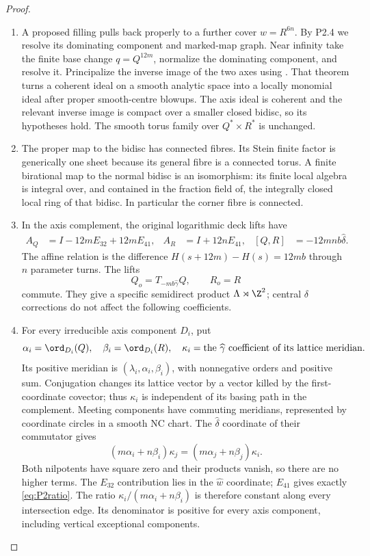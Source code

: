 \begin{proof}
\begin{enumerate}[label=\arabic*.,leftmargin=*]
\item A proposed filling pulls back properly to a further cover $w=R^{6n}$. By P2.4 we resolve its dominating component and marked-map graph. Near infinity take the finite base change $q=Q^{12m}$, normalize the dominating component, and resolve it. Principalize the inverse image of the two axes using \cite[Theorem 1.10, preprint p.~7, with the analytic category in (0.2), p.~3]{BM97}. That theorem turns a coherent ideal on a smooth analytic space into a locally monomial ideal after proper smooth-centre blowups. The axis ideal is coherent and the relevant inverse image is compact over a smaller closed bidisc, so its hypotheses hold. The smooth torus family over $Q^*\times R^*$ is unchanged.

\item The proper map to the bidisc has connected fibres. Its Stein finite factor is generically one sheet because its general fibre is a connected torus. A finite birational map to the normal bidisc is an isomorphism: its finite local algebra is integral over, and contained in the fraction field of, the integrally closed local ring of that bidisc. In particular the corner fibre is connected.

\item In the axis complement, the original logarithmic deck lifts have
\begin{align*}
 A_Q&=I-12mE_{32}+12mE_{41},&
 A_R&=I+12nE_{41},&
 [Q,R]&=-12mnb\widehat\delta.
\end{align*}
The affine relation is the difference $H(s+12m)-H(s)=12mb$ through $n$ parameter turns. The lifts
\[
 Q_o=T_{-mb\widehat\gamma}Q,\qquad R_o=R
\]
commute. They give a specific semidirect product $\Lambda\rtimes\Z^2$; central $\delta$ corrections do not affect the following coefficients.

\item For every irreducible axis component $D_i$, put
\[
 \alpha_i=\ord_{D_i}(Q),\quad\beta_i=\ord_{D_i}(R),\quad
 \kappa_i=\text{the }\widehat\gamma\text{ coefficient of its lattice meridian}.
\]
Its positive meridian is $(\lambda_i,\alpha_i,\beta_i)$, with nonnegative orders and positive sum. Conjugation changes its lattice vector by a vector killed by the first-coordinate covector; thus $\kappa_i$ is independent of its basing path in the complement. Meeting components have commuting meridians, represented by coordinate circles in a smooth NC chart. The $\widehat\delta$ coordinate of their commutator gives
\begin{equation}\label{eq:P2ratio}
 (m\alpha_i+n\beta_i)\kappa_j=(m\alpha_j+n\beta_j)\kappa_i.
\end{equation}
Both nilpotents have square zero and their products vanish, so there are no higher terms. The $E_{32}$ contribution lies in the $\widehat w$ coordinate; $E_{41}$ gives exactly \eqref{eq:P2ratio}. The ratio $\kappa_i/(m\alpha_i+n\beta_i)$ is therefore constant along every intersection edge. Its denominator is positive for every axis component, including vertical exceptional components.


\end{enumerate}
\end{proof}
